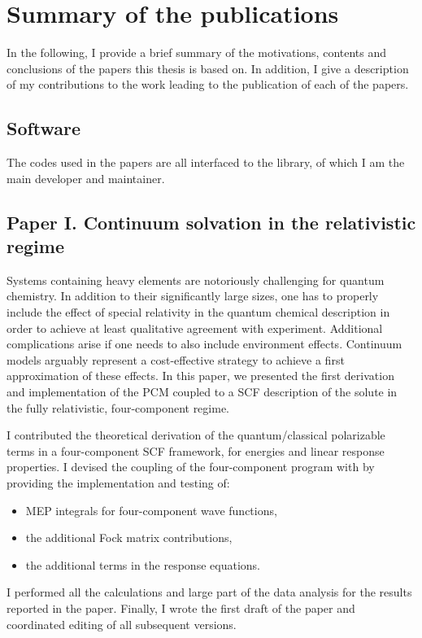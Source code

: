 \chapter{Summary of the publications}\label{ch:publications-summary}

In the following, I provide a brief summary of the motivations, contents and
conclusions of the papers this thesis is based on.
In addition, I give a description of my contributions to the work leading to
the publication of each of the papers.

\section*{Software}

The codes used in the papers are all interfaced to the \pcmsolver library,
of which I am the main developer and maintainer.

\section*{Paper I. Continuum solvation in the relativistic regime}

Systems containing heavy elements are notoriously challenging for quantum chemistry.
In addition to their significantly large sizes, one has to properly include the
effect of special relativity in the quantum chemical description in order to
achieve at least qualitative agreement with experiment.
Additional complications arise if one needs to also include environment effects.
Continuum models arguably represent a cost-effective strategy to achieve a first
approximation of these effects.
In this paper, we presented the first derivation and implementation of the \acs{PCM}
coupled to a \acs{SCF} description of the solute in the fully relativistic, four-component
regime.

I contributed the theoretical derivation of the quantum/classical polarizable
terms in a four-component \acs{SCF} framework, for energies and linear response
properties. I devised the coupling of the four-component program \DIRAC with
\pcmsolver by providing the implementation and testing of:
\begin{itemize}
  \item \acs{MEP} integrals for four-component wave functions,
  \item the additional Fock matrix contributions,
  \item the additional terms in the response equations.
\end{itemize}
I performed all the calculations and large part of the data analysis
for the results reported in the paper.
Finally, I wrote the first draft of the paper and coordinated editing of
all subsequent versions.

